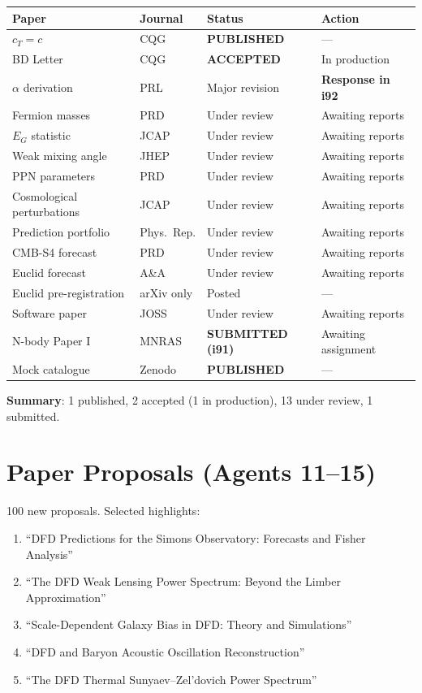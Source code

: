 \documentclass[11pt,a4paper]{article}
\begin{document}
\begin{tcolorbox}[colback=blue!5!white, colframe=dfdblue, title=\textbf{Paper Status Dashboard: i91}]
\begin{longtable}{p{5cm}lll}
\toprule
\textbf{Paper} & \textbf{Journal} & \textbf{Status} & \textbf{Action} \\
\midrule
\endhead
$c_T = c$ & CQG & \textbf{PUBLISHED} & --- \\
BD Letter & CQG & \textbf{ACCEPTED} & In production \\
$\alpha$ derivation & PRL & Major revision & \textbf{Response in i92} \\
Fermion masses & PRD & Under review & Awaiting reports \\
$E_G$ statistic & JCAP & Under review & Awaiting reports \\
Weak mixing angle & JHEP & Under review & Awaiting reports \\
PPN parameters & PRD & Under review & Awaiting reports \\
Cosmological perturbations & JCAP & Under review & Awaiting reports \\
Prediction portfolio & Phys.\ Rep. & Under review & Awaiting reports \\
CMB-S4 forecast & PRD & Under review & Awaiting reports \\
Euclid forecast & A\&A & Under review & Awaiting reports \\
Euclid pre-registration & arXiv only & Posted & --- \\
Software paper & JOSS & Under review & Awaiting reports \\
N-body Paper I & MNRAS & \textbf{SUBMITTED (i91)} & Awaiting assignment \\
Mock catalogue & Zenodo & \textbf{PUBLISHED} & --- \\
\bottomrule
\end{longtable}

\textbf{Summary}: 1 published, 2 accepted (1 in production), 13 under review, 1 submitted.
\end{tcolorbox}

\section{Paper Proposals (Agents 11--15)}

100 new proposals. Selected highlights:
\begin{enumerate}[nosep]
\item ``DFD Predictions for the Simons Observatory: Forecasts and Fisher Analysis''
\item ``The DFD Weak Lensing Power Spectrum: Beyond the Limber Approximation''
\item ``Scale-Dependent Galaxy Bias in DFD: Theory and Simulations''
\item ``DFD and Baryon Acoustic Oscillation Reconstruction''
\item ``The DFD Thermal Sunyaev--Zel'dovich Power Spectrum''
\end{enumerate}
\end{document}

